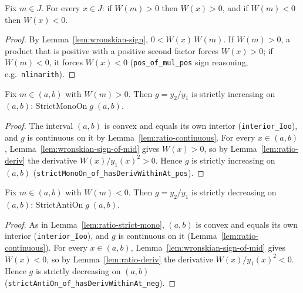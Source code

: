 \begin{lemma}
    \label{lem:wronskian-sign-of-mid}
    \leanok
    Fix $m \in J$. For every $x \in J$: if $W(m) > 0$ then $W(x) > 0$, and if
    $W(m) < 0$ then $W(x) < 0$.
\end{lemma}
\begin{proof}
    By Lemma~\ref{lem:wronskian-sign}, $0 < W(x)\,W(m)$. If $W(m) > 0$, a
    product that is positive with a positive second factor forces $W(x) > 0$;
    if $W(m) < 0$, it forces $W(x) < 0$ (\texttt{pos\_of\_mul\_pos} sign
    reasoning, e.g.\ \texttt{nlinarith}).
\end{proof}

\begin{lemma}
    \label{lem:ratio-strict-mono}
    \leanok
    Fix $m \in (a,b)$ with $W(m) > 0$. Then $g = y_2/y_1$ is strictly increasing
    on $(a,b)$: $\mathrm{StrictMonoOn}\;g\;(a,b)$.
\end{lemma}
\begin{proof}
    The interval $(a,b)$ is convex and equals its own interior
    (\texttt{interior\_Ioo}), and $g$ is continuous on it by
    Lemma~\ref{lem:ratio-continuous}. For every $x \in (a,b)$,
    Lemma~\ref{lem:wronskian-sign-of-mid} gives $W(x) > 0$, so by
    Lemma~\ref{lem:ratio-deriv} the derivative $W(x)/y_1(x)^2 > 0$. Hence $g$ is
    strictly increasing on $(a,b)$
    (\texttt{strictMonoOn\_of\_hasDerivWithinAt\_pos}).
\end{proof}

\begin{lemma}
    \label{lem:ratio-strict-anti}
    \leanok
    Fix $m \in (a,b)$ with $W(m) < 0$. Then $g = y_2/y_1$ is strictly decreasing
    on $(a,b)$: $\mathrm{StrictAntiOn}\;g\;(a,b)$.
\end{lemma}
\begin{proof}
    As in Lemma~\ref{lem:ratio-strict-mono}, $(a,b)$ is convex and equals its
    own interior (\texttt{interior\_Ioo}), and $g$ is continuous on it
    (Lemma~\ref{lem:ratio-continuous}). For every $x \in (a,b)$,
    Lemma~\ref{lem:wronskian-sign-of-mid} gives $W(x) < 0$, so by
    Lemma~\ref{lem:ratio-deriv} the derivative $W(x)/y_1(x)^2 < 0$. Hence $g$ is
    strictly decreasing on $(a,b)$
    (\texttt{strictAntiOn\_of\_hasDerivWithinAt\_neg}).
\end{proof}

